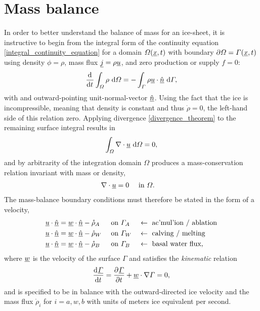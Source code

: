 
\chapter{Mass balance} \label{ssn_mass_balance}


In order to better understand the balance of mass for an ice-sheet, it is instructive to begin from the integral form of the continuity equation \cref{integral_continuity_equation} for a domain $\varOmega(\underline{x},t)$ with boundary $\partial \varOmega = \varGamma(\underline{x},t)$ using density $\phi = \rho$, mass flux $\underline{j} = \rho \underline{u}$, and zero production or supply $f = 0$:
\begin{align*}
  \frac{\mathrm{d}{^{}} }{\mathrm{d} t{^{}} } \int_{\varOmega} \rho \ \mathrm{d}\varOmega = - \int_{\varGamma} \rho \underline{u} \cdot \underline{\hat{n}} \ \mathrm{d}\varGamma,
\end{align*}
with and outward-pointing unit-normal-vector $\underline{\hat{n}}$.
Using the fact that the ice is incompressible, meaning that density is constant and thus $\dot{\rho} = 0$, the left-hand side of this relation zero.
Applying divergence \cref{divergence_theorem}  to the remaining surface integral results in
\begin{align*}
  \int_{\varOmega} \nabla \cdot \underline{u} \ \mathrm{d}\varOmega = 0,
\end{align*}
and by arbitrarity of the integration domain $\Omega$ produces a mass-conservation relation invariant with mass or density,
\begin{align}
  \nabla \cdot \underline{u} &= 0 &&\text{ in } \varOmega.
\end{align}
The mass-balance boundary conditions must therefore be stated in the form of a velocity,
\begin{align}
  \label{impenetrability}
  \underline{u} \cdot \underline{\hat{n}} &= \underline{w} \cdot \underline{\hat{n}} - \mathring{\rho}_A &&\text{ on } \varGamma_A &&\leftarrow \text{ ac'mul'ion / ablation} \\
  \underline{u} \cdot \underline{\hat{n}} &=  \underline{w} \cdot \underline{\hat{n}} - \mathring{\rho}_W &&\text{ on } \varGamma_W &&\leftarrow \text{ calving / melting} \\
  \underline{u} \cdot \underline{\hat{n}} &=  \underline{w} \cdot \underline{\hat{n}} - \mathring{\rho}_B &&\text{ on } \varGamma_B &&\leftarrow \text{ basal water flux},
\end{align}
where $\underline{w}$ is the velocity of the surface $\Gamma$ and satisfies the  \emph{kinematic} relation
\begin{align}
  \label{kinematic_boundary_balance}
  \frac{\mathrm{d}{^{}} \underline{\varGamma}}{\mathrm{d} t{^{}} } = \frac{\partial{^{}} \underline{\varGamma}}{\partial t{^{}} } + \underline{w} \cdot \nabla \varGamma = 0,
\end{align}
and is specified to be in balance with the outward-directed ice velocity and the mass flux $\mathring{\rho}_i$ for $i=a,w,b$ with units of meters ice equivalent per second.
